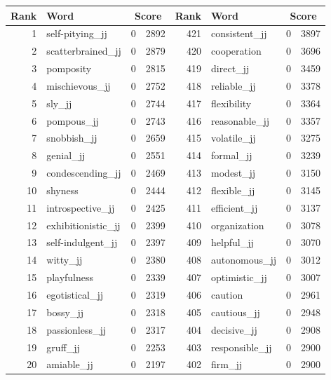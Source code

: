 \begin{table}[tbp]
    \begin{tabular}{| rlr@{.}l | rlr@{.}l |}
    \hline
    \textbf{Rank} & \textbf{Word} & \multicolumn{2}{c|}{\textbf{Score}} & \textbf{Rank} & \textbf{Word} & \multicolumn{2}{c|}{\textbf{Score}} \\
    \hline
    1 & self-pitying\_jj & 0 & 2892    &    421 & consistent\_jj & 0 & 3897 \\
    2 & scatterbrained\_jj & 0 & 2879    &    420 & cooperation & 0 & 3696 \\
    3 & pomposity & 0 & 2815    &    419 & direct\_jj & 0 & 3459 \\
    4 & mischievous\_jj & 0 & 2752    &    418 & reliable\_jj & 0 & 3378 \\
    5 & sly\_jj & 0 & 2744    &    417 & flexibility & 0 & 3364 \\
    6 & pompous\_jj & 0 & 2743    &    416 & reasonable\_jj & 0 & 3357 \\
    7 & snobbish\_jj & 0 & 2659    &    415 & volatile\_jj & 0 & 3275 \\
    8 & genial\_jj & 0 & 2551    &    414 & formal\_jj & 0 & 3239 \\
    9 & condescending\_jj & 0 & 2469    &    413 & modest\_jj & 0 & 3150 \\
    10 & shyness & 0 & 2444    &    412 & flexible\_jj & 0 & 3145 \\
    11 & introspective\_jj & 0 & 2425    &    411 & efficient\_jj & 0 & 3137 \\
    12 & exhibitionistic\_jj & 0 & 2399    &    410 & organization & 0 & 3078 \\
    13 & self-indulgent\_jj & 0 & 2397    &    409 & helpful\_jj & 0 & 3070 \\
    14 & witty\_jj & 0 & 2380    &    408 & autonomous\_jj & 0 & 3012 \\
    15 & playfulness & 0 & 2339    &    407 & optimistic\_jj & 0 & 3007 \\
    16 & egotistical\_jj & 0 & 2319    &    406 & caution & 0 & 2961 \\
    17 & bossy\_jj & 0 & 2318    &    405 & cautious\_jj & 0 & 2948 \\
    18 & passionless\_jj & 0 & 2317    &    404 & decisive\_jj & 0 & 2908 \\
    19 & gruff\_jj & 0 & 2253    &    403 & responsible\_jj & 0 & 2900 \\
    20 & amiable\_jj & 0 & 2197    &    402 & firm\_jj & 0 & 2900 \\

\end{tabular}
\end{table}
